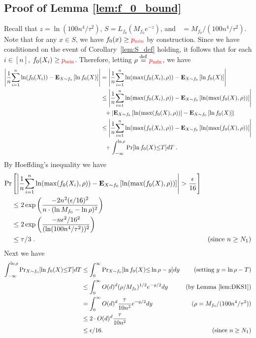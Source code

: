 \documentclass[final,12pt]{colt2018}
\newcommand{\nnew}[1]{{\color{red} #1}}
\newcommand{\nnew}[1]{#1}
\newcommand{\new}[1]{{\color{red} #1}}
\newcommand{\new}[1]{{#1}}
\newtheorem{informal theorem}[theorem]{Theorem (informal statement)}
\newcommand{\eqdef}{\stackrel{{\mathrm {\footnotesize def}}}{=}}
\newcommand{\E}{\mathbf{E}}
\newcommand{\eps}{\epsilon}
\newcommand{\pmin}{\mathop{p_{\mathrm{min}}}}
\begin{document}
\subsection{ {Proof of Lemma \ref{lem:f_0_bound}}}
\nnew{Recall that $z = \ln (100 n^4 /\tau^2)$, $S = L_{f_0}(M_{f_0} e^{-z})$, and $\pmin = M_{f_0} /(100n^4/\tau^2)$.}
Note that for any $x \in S$, we have $f_0(x) \geq \new{\pmin}$ by construction.
\new{Since we have conditioned on the event of Corollary~\ref{lem:S_def} holding, it follows that for each $i \in [n]$, 
$f_0(X_i) \geq \new{\pmin}$.}
Therefore, letting $\rho \eqdef \new{\pmin}$, we have
\begin{align}
\left| \frac{1}{n} {\sum_{i=1}^n \ln( f_0(X_i) ) } - {\E}_{X\sim f_0}\left[\ln f_0(X)\right] \right| \notag 
&= \left|\frac{1}{n} { \sum_{i=1}^n } \ln(\max(f_0(X_i), \rho)) - {\E}_{X\sim f_0}\left[\ln f_0(X)\right]\right| \notag \\
&\leq \left|\frac{1}{n} { \sum_{i=1}^n } \ln(\max(f_0(X_i), \rho)) - {\E}_{X\sim f_0}\left[\ln(\max(f_0(X), \rho)) \right]\right| \notag \notag \\
&~~ + \left| {\E}_{X\sim f_0}\left[\ln(\max(f_0(X), \rho)) \right] - {\E}_{X\sim f_0}\left[\ln f_0(X) \right]\right| \notag \\
&\leq \left|\frac{1}{n} { \sum_{i=1}^n } \ln(\max(f_0(X_i), \rho)) - {\E}_{X\sim f_0}\left[\ln(\max(f_0(X), \rho)) \right]\right| \notag \\
&~~ + \int_{-\infty}^{\ln\rho} \Pr[\ln f_0(X) { \leq } T] dT \;. \label{eq:hoeff_exp}
\end{align}
By Hoeffding's inequality we have 
\begin{align}
\Pr&\left[\left|\frac{1}{n} { \sum_{i=1}^n } \ln(\max(f_0(X_i), \rho)) - {\E}_{X\sim f_0}\left[\ln(\max(f_0(X), \rho)) \right]\right| > \frac{\eps}{16} \right] \notag \\
&\leq 2 \exp \left(\frac{-2 n^2 (\eps / 16)^2}{n \cdot (\ln M_{f_0} - \ln \rho)^2}\right) \notag \\
&\leq 2 \exp \left(\frac{-n \eps^2/16^2}{(\ln(100 n^4/\tau^2))^2}\right) \notag \\
&\leq \tau/3  \label{eq:exp_pmin}  \;. & \text{(since $n \geq N_1$)}
\end{align}
Next we have
\begin{align}
\int_{-\infty}^{\ln \rho} {\Pr}_{{X\sim f_0}}[\ln f_0(X) { \leq } T] dT &\leq \int_{0}^{\infty} {\Pr}_{{X\sim f_0}}[\ln f_0(X) { \leq } \ln\rho - y] dy \notag &\text{(setting $y = \ln\rho - T$)} \\
&\leq \int_{0}^{\infty} O(d)^d (\rho / M_{f_0})^{1/2} e^{-y/2} dy  & \text{(by Lemma \ref{lem:DKS1})} \notag \\
&= \int_{0}^{\infty} O(d)^d \frac{\tau}{10n^2} e^{-y/2} dy & \text{($\rho = M_{f_0} / (100 n^4/\tau^2)$)} \notag \\
&\leq 2 \cdot O(d)^d \frac{\tau}{10n^2} \notag \\
&\leq \eps / 16. & \text{(since $n\geq N_1$)} \label{eq:exp_tail}
\end{align}
\end{document}
